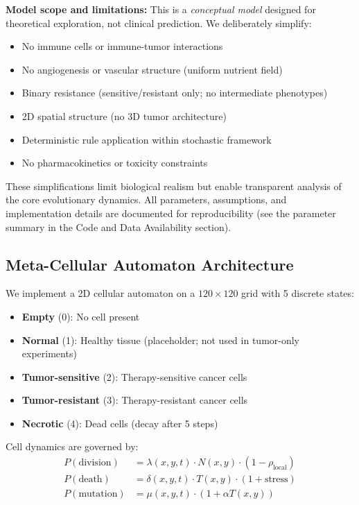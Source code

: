 \documentclass[11pt,a4paper]{article}
\begin{document}
\textbf{Model scope and limitations:} This is a \textit{conceptual model} designed for theoretical exploration, not clinical prediction. We deliberately simplify:
\begin{itemize}
    \item No immune cells or immune-tumor interactions
    \item No angiogenesis or vascular structure (uniform nutrient field)
    \item Binary resistance (sensitive/resistant only; no intermediate phenotypes)
    \item 2D spatial structure (no 3D tumor architecture)
    \item Deterministic rule application within stochastic framework
    \item No pharmacokinetics or toxicity constraints
\end{itemize}

These simplifications limit biological realism but enable transparent analysis of the core evolutionary dynamics. All parameters, assumptions, and implementation details are documented for reproducibility (see the parameter summary in the Code and Data Availability section).

\subsection{Meta-Cellular Automaton Architecture}

We implement a 2D cellular automaton on a $120 \times 120$ grid with 5 discrete states:
\begin{itemize}
    \item \textbf{Empty} (0): No cell present
    \item \textbf{Normal} (1): Healthy tissue (placeholder; not used in tumor-only experiments)
    \item \textbf{Tumor-sensitive} (2): Therapy-sensitive cancer cells
    \item \textbf{Tumor-resistant} (3): Therapy-resistant cancer cells
    \item \textbf{Necrotic} (4): Dead cells (decay after 5 steps)
\end{itemize}

Cell dynamics are governed by:
\begin{align}
    P(\text{division}) &= \lambda(x,y,t) \cdot N(x,y) \cdot (1 - \rho_{\text{local}}) \\
    P(\text{death}) &= \delta(x,y,t) \cdot T(x,y) \cdot (1 + \text{stress}) \\
    P(\text{mutation}) &= \mu(x,y,t) \cdot (1 + \alpha T(x,y))
\end{align}
\end{document}
